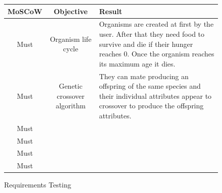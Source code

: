 \documentclass[a4paper, oneside, 11pt]{report}
\begin{document}
\smallskip 
\begin{landscape}
\begin{figure}[H]
	\caption{Requirements Testing} \label{requirements-testing}
	\centering
	\begin{tabular}{c|c|p{}}
		MoSCoW & Objective & Result \\ \hline
		Must & Organism life cycle & Organisms are created at first by the user. After that they need food to survive and die if their hunger reaches 0. Once the organism reaches its maximum age it dies.  \\ \hline
		Must & Genetic crossover algorithm & They can mate producing an offspring of the same species and their individual attributes appear to crossover to produce the offspring attributes.  \\ \hline
		Must &  &   \\ \hline
		Must &  &   \\ \hline
		Must &  &   \\ \hline
		Must &  &   \\ \hline
	\end{tabular}
\end{figure}
\end{landscape}
\smallskip 
\end{document}
